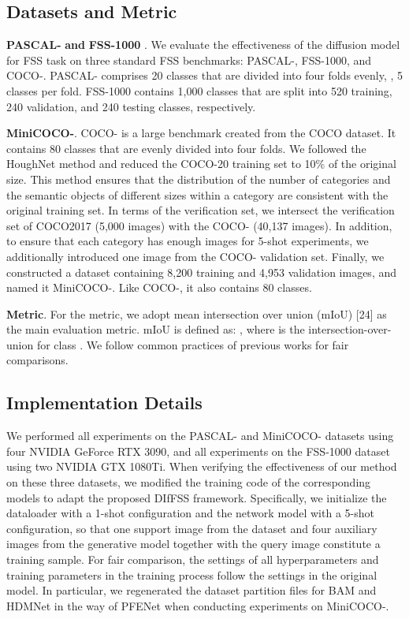 \documentclass[sigconf]{acmart}
\begin{document}
\subsection{Datasets and Metric}
\textbf{PASCAL-} \cite{oslsm} \textbf{and} \textbf{FSS-1000} \cite{fss1000}. We evaluate the effectiveness of the diffusion model for FSS task on three standard FSS benchmarks: PASCAL-, FSS-1000, and COCO-. PASCAL- comprises 20 classes that are divided into four folds evenly, , 5 classes per fold. FSS-1000 contains 1,000 classes that are split into 520 training, 240 validation, and 240 testing classes, respectively. 

\textbf{MiniCOCO-}. COCO-\cite{fwbnet} is a large benchmark created from the COCO dataset. It contains 80 classes that are evenly divided into four folds. We followed the HoughNet method\cite{samet2020houghnet} and reduced the COCO-20 training set to 10\% of the original size. This method ensures that the distribution of the number of categories and the semantic objects of different sizes within a category are consistent with the original training set. In terms of the verification set, we intersect the verification set of COCO2017 (5,000 images) with the COCO- (40,137 images). In addition, to ensure that each category has enough images for 5-shot experiments, we additionally introduced one image from the COCO- validation set. Finally, we constructed a dataset containing 8,200 training and 4,953 validation images, and named it MiniCOCO-. Like COCO-, it also contains 80 classes.

\textbf{Metric}. For the metric, we adopt mean intersection over union (mIoU) [24] as the main evaluation metric. mIoU is defined as: , where  is the intersection-over-union for class . We follow common practices of previous works for fair comparisons.


\subsection{Implementation Details}
We performed all experiments on the PASCAL- and MiniCOCO- datasets using four NVIDIA GeForce RTX 3090, and all experiments on the FSS-1000 dataset using two NVIDIA GTX 1080Ti. When verifying the effectiveness of our method on these three datasets, we modified the training code of the corresponding models to adapt the proposed DIfFSS framework. Specifically, we initialize the dataloader with a 1-shot configuration and the network model with a 5-shot configuration, so that one support image from the dataset and four auxiliary images from the generative model together with the query image constitute a training sample. For fair comparison, the settings of all hyperparameters and training parameters in the training process follow the settings in the original model. In particular, we regenerated the dataset partition files for BAM  \cite{BAM2022} and HDMNet \cite{HDMNet2023} in the way of PFENet \cite{pfenet} when conducting experiments on MiniCOCO-.
\end{document}
